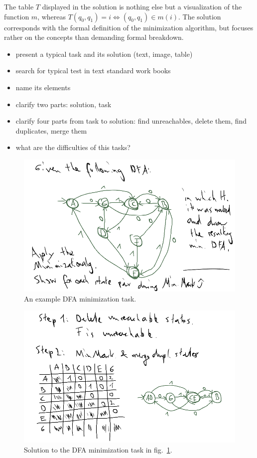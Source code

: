 The table $T$ displayed in the solution is nothing else but a visualization of the function $m$, whereas $T(q_0, q_1) = i \Leftrightarrow (q_0, q_1) \in m(i)$. The solution corresponds with the formal definition of the minimization algorithm, but focuses rather on the concepts than demanding formal breakdown.

\begin{itemize}
	\item present a typical task and its solution (text, image, table)
	\item search for typical test in text standard work books
	\item name its elements
	\item clarify two parts: solution, task
	\item clarify four parts from task to solution: find unreachables, delete them, find duplicates, merge them
	\item what are the difficulties of this tasks?
\end{itemize}

\begin{figure}
	\includegraphics[width=\linewidth]{images/dfa_ex_task.png}
	\caption{An example DFA minimization task.}
	\label{fig:dfa_ex_task}
\end{figure}

\begin{figure}
	\includegraphics[width=\linewidth]{images/dfa_ex_sol.png}
	\caption{Solution to the DFA minimization task in fig.~\ref{fig:dfa_ex_task}.}
	\label{fig:dfa_ex_sol}
\end{figure}

